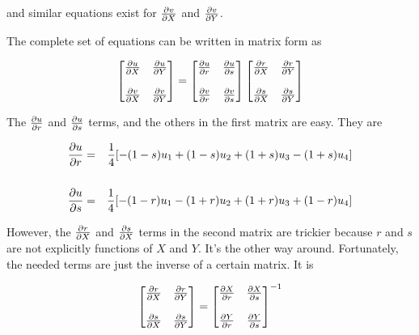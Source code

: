 and similar equations exist for $ {\partial v \over \partial X} $  and  $ {\partial v \over \partial Y} $.

The complete set of equations can be written in matrix form as

\begin{align*}
\begin{bmatrix}
{\partial u \over \partial X} & {\partial u \over \partial Y} \\
\\
{\partial v \over \partial X} & {\partial v \over \partial Y} 
\end{bmatrix}
=
\begin{bmatrix}
{\partial u \over \partial r} & {\partial u \over \partial s} \\
\\
{\partial v \over \partial r} & {\partial v \over \partial s} 
\end{bmatrix}
\begin{bmatrix}
{\partial r \over \partial X} & {\partial r \over \partial Y} \\
\\
{\partial s \over \partial X} & {\partial s \over \partial Y} 
\end{bmatrix}
\end{align*}

The $ {\partial u \over \partial r} $  and  $ {\partial u \over \partial s} $ terms, and the others in the first matrix are easy. They are

\begin{eqnarray*}
{\partial u \over \partial r} & = & {1 \over 4} [-(1-s)u_1 + (1-s)u_2 + (1+s)u_3 - (1+s)u_4]  \\
\\
{\partial u \over \partial s} & = & {1 \over 4} [-(1-r)u_1 - (1+r)u_2 + (1+r)u_3 + (1-r)u_4]
\end{eqnarray*}

However, the $ {\partial r \over \partial X} $  and  $ {\partial s \over \partial X} $ terms in the second matrix are trickier because $ r $ and $ s $ are not explicitly functions of $ X $ and $ Y $.  It's the other way around. Fortunately, the needed terms are just the inverse of a certain matrix. It is

\begin{eqnarray*}
\begin{bmatrix}
{\partial r \over \partial X} & {\partial r \over \partial Y} \\
\\
{\partial s \over \partial X} & {\partial s \over \partial Y} 
\end{bmatrix}
=
\begin{bmatrix}
{\partial X \over \partial r} & {\partial X \over \partial s} \\
\\
{\partial Y \over \partial r} & {\partial Y \over \partial s} 
\end{bmatrix}^{-1}
\end{eqnarray*}

